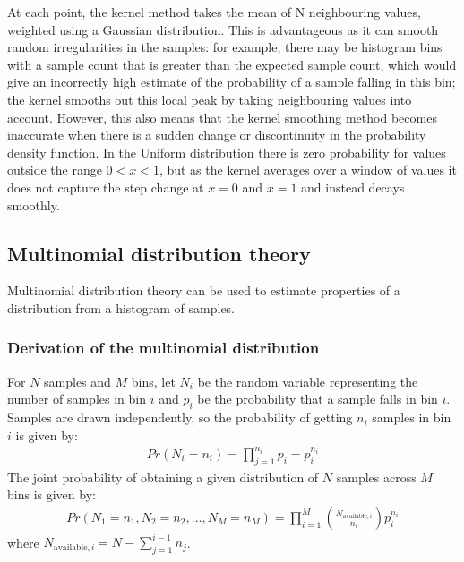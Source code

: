 \documentclass[a4paper]{article}
\begin{document}
At each point, the kernel method takes the mean of N neighbouring values, weighted using a Gaussian distribution.
This is advantageous as it can smooth random irregularities in the samples: for example, there may be histogram bins
with a sample count that is greater than the expected sample count, which would give an incorrectly high estimate of
the probability of a sample falling in this bin; the kernel smooths out this local peak by taking neighbouring values
into account.
However, this also means that the kernel smoothing method becomes inaccurate when there is a sudden change or
discontinuity in the probability density function.
In the Uniform distribution there is zero probability for values outside the range $0<x<1$, but as the kernel averages
over a window of values it does not capture the step change at $x=0$ and $x=1$ and instead decays smoothly.


\subsection{Multinomial distribution theory}

Multinomial distribution theory can be used to estimate properties of a distribution from a histogram of samples.

\subsubsection{Derivation of the multinomial distribution}
For $N$ samples and $M$ bins, let $N_i$ be the random variable representing the number of samples in bin $i$ and $p_i$
be the probability that a sample falls in bin $i$.
Samples are drawn independently, so the probability of getting $n_i$ samples in bin $i$ is given by:
\begin{align*}
    Pr(N_i = n_i) = \prod_{j=1}^{n_i} p_i = p_i^{n_i}
\end{align*}
The joint probability of obtaining a given distribution of $N$ samples across $M$ bins is given by:
\begin{align}
    \label{eq:joint_bin_probability_1}
    Pr(N_1 = n_1, N_2 = n_2, \dots, N_M= n_M) =
     \prod_{i=1}^{M} {N_{\text{available}, i} \choose {n_i}} p_i^{n_i}
\end{align}
where $N_{\text{available}, i} = N - \sum_{j=1}^{i-1} n_j$.
\end{document}
